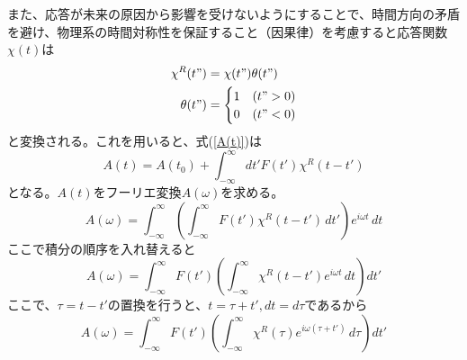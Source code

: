 \documentclass[11pt,a4j]{jreport}
\begin{document}
また、応答が未来の原因から影響を受けないようにすることで、時間方向の矛盾を避け、物理系の時間対称性を保証すること（因果律）を考慮すると応答関数$\chi(t)$は
\begin{align}
  \chi^R(t") &= \chi(t")\theta(t") \label{chi_R} \\
  \theta(t") &= \begin{cases} 
     1 & (t" > 0)  \\
     0 & (t" < 0)
   \end{cases} \label{theta_w}
 \end{align}
と変換される。これを用いると、式(\ref{A(t)})は
\begin{equation}
  A(t)=A(t_0)+\int_{-\infty}^{\infty}{dt'F(t') \chi^R(t-t')}
\end{equation}
となる。$A(t)$をフーリエ変換$A(\omega)$を求める。
\begin{equation}
  A(\omega)=\int_{-\infty}^{\infty} \left( \int_{-\infty}^{\infty} F(t') \chi^R(t - t') \, dt' \right) e^{i \omega t} \, dt
\end{equation}
ここで積分の順序を入れ替えると
\begin{equation}
  A(\omega) = \int_{-\infty}^{\infty} F(t') \left( \int_{-\infty}^{\infty} \chi^R(t - t') e^{i \omega t} \, dt \right) dt'
\end{equation}
ここで、$\tau=t-t'$の置換を行うと、$t=\tau+t',dt=d\tau$であるから
\begin{equation}
  A(\omega) = \int_{-\infty}^{\infty} F(t') \left( \int_{-\infty}^{\infty} \chi^R(\tau) e^{i \omega (\tau + t')} \, d\tau \right) dt'
\end{equation}
\end{document}
